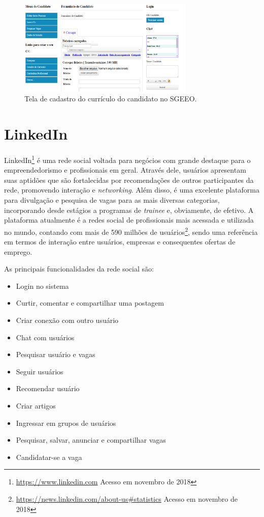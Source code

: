 \documentclass[cic,tc]{iiufrgs}
\begin{document}
\begin{figure}[h]
    \caption{Tela de cadastro do currículo do candidato no SGEEO.}
        \begin{center}
            \includegraphics[width=0.75\textwidth]{figuras/rel02.png}
        \end{center}
    \label{telaCandidatoSGEEO}
\end{figure}

\section{LinkedIn}
\label{trabRelLinkedin}

LinkedIn\footnote{{\url{https://www.linkedin.com} Acesso em novembro de 2018}} é uma rede social voltada para negócios com grande destaque para o empreendedorismo e profissionais em geral. Através dele, usuários apresentam suas aptidões que são fortalecidas por recomendações de outros participantes da rede, promovendo interação e \textit{networking}. Além disso, é uma excelente plataforma para divulgação e pesquisa de vagas para as mais diversas categorias, incorporando desde estágios a programas de \textit{trainee} e, obviamente, de efetivo. A plataforma atualmente é a redes social de profissionais mais acessada e utilizada no mundo, contando com mais de 590 milhões de usuários\footnote{{\url{https://news.linkedin.com/about-us\#statistics} Acesso em novembro de 2018}}, sendo uma referência em termos de interação entre usuários, empresas e consequentes ofertas de emprego.

As principais funcionalidades da rede social são:
\begin{itemize}
    \item Login no sistema
    \item Curtir, comentar e compartilhar uma postagem
    \item Criar conexão com outro usuário
    \item Chat com usuários
    \item Pesquisar usuário e vagas
    \item Seguir usuários
    \item Recomendar usuário
    \item Criar artigos
    \item Ingressar em grupos de usuários
    \item Pesquisar, salvar, anunciar e compartilhar vagas
    \item Candidatar-se a vaga
\end{itemize}
\end{document}
